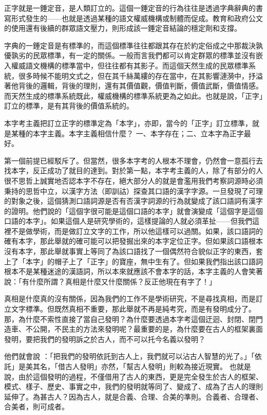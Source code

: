 \documentclass[a5paper, 12pt, openany]{book} %
\begin{document}
正字就是一錘定音，是人類訂立的。這個一錘定音的行為往往是透過字典辭典的書寫形式發生的——也就是透過某種的語文權威機構或制體而促成。教育和政府公文的使用還有後續的群眾語文壓力，則形成該一錘定音結論的穩定劑和支撐。

字典的一錘定音是有標準的，而這個標準往往都跟其存在於約定俗成之中那裁決孰優孰劣的民眾標準，有一定的關係。一般而言我們都可以肯定群眾的標準並沒有嵌入權威語文機構的標準當中，但往往都有其影子。而這個天然生成的民眾標準系統，很多時候不能明文式之，但在其千絲萬縷的存在當中，在其影響漣漪中，抒溢著他背後的邏輯，背後的理則，還有其價值觀，價值判斷，價值武斷，價值情感。而天然生成的標準系統既此，權威機構的標準系統更為之如此。也就是說，「正字」訂立的標準，是有其背後的價值系統的。 

本字考主義把訂立正字的標準定為「本字」，亦即，當今的「正字」訂立標準，就是某種的本字主義。本字主義相信什麼？ 一、本字存在；二、立本字為正字最好。

第一個前提已經駁斥了。但當然，很多本字考的人根本不理會，仍然會一意孤行去找本字，反正成功了就目的達到。對於第一點，本字考主義的人，除了有部分的人很不思哲上誠實地否認本字不存在，絕大部分人的就是會濫用我們考察詞源時必須秉持的思哲中立，以漢字方法（即訓詁）探查其口語的漢字字源。一旦發現了可理的對象之後，這個猜測口語詞源是否有否漢字詞源的行為就變成了該口語詞有漢字的證明。他們說的「這個字很可能是這個口語的本字」就會演變成「這個字是這個口語的本字」。如果這個人是研究學術的，這樣提論的人就必須革扯——但我們這裡不是做學術，而是做訂立文字的工作，所以他這樣可以過關。如果，該口語詞的確有本字，那此舉就的確可能可以把發掘出來的本字定位正字。但如果該口語根本沒有本字，那此舉就事實上等同了為該口語找了一個偶然符合貌似正字的東西，套上了「本字」的帽子上了「正字」的寶座，無中生有了。但如果我們指出該口語詞根本不是某種迷途的漢語詞，所以本來就應該不會本字的話，本字主義的人會笑著說：「有什麼所謂？真相是什麼又什麼關係？反正他現在有字了！」

真相是什麼真的沒有關係，因為我們的工作不是學術研究，不是尋找真相，而是訂立文字標準。但既然真相不重要，那此舉就不再是純考究，而是有發明成分了。那，為什麼不索性直接了當自己發明？為什麼要透過本字考這個迂迴、封閉、閉門造車、不公開，不民主的方法來發明呢？最重要的是，為什麼要在古人的框架裏面發明，要把我們的發明訴之於古人，而不可以托今名義以發明？

他們就會說 ：「把我們的發明依託到古人上，我們就可以沾古人智慧的光了。」「依託」是美其名，「借古人發明」亦然，「幫古人發明」則較為接近現實。 也就是說，由於這個發明的過程，不僅借用了古人的東西，更是完全發生於古人的框架、模式、樣子、歷史、事實之中，我們的發明就等同了、變成了、成為了古人的理則延伸了。為甚古人？因為古人，就是合義、合理、合美的準則。合義者、合理者、合美者，則可成者。
\end{document}
